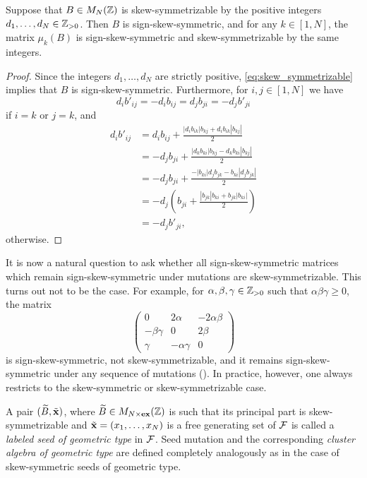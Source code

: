 \begin{proposition}\label{prop:mutation_preserves_skew_symmetrizable}
	Suppose that $B \in M_N(\mathbb{Z})$ is skew-symmetrizable by the positive integers $d_1, \dots, d_N \in \mathbb{Z}_{>0}$. Then $B$ is sign-skew-symmetric, and for any $k \in [1, N]$, the matrix $\mu_k(B)$ is sign-skew-symmetric and skew-symmetrizable by the same integers.
\end{proposition}
\begin{proof}
	Since the integers $d_1, \dots, d_N$ are strictly positive, \cref{eq:skew_symmetrizable} implies that $B$ is sign-skew-symmetric. Furthermore, for $i,j \in [1, N]$ we have
	\begin{equation*}
		d_i b'_{ij} = - d_i  b_{ij} = d_j b_{ji} = -d_j b'_{ji}
	\end{equation*}
	if $i =k$ or $j = k$, and
	\begin{align*}
		d_i b'_{ij}
		 & = d_i b_{ij} + \frac{|d_i b_{ik}|b_{kj} + d_i b_{ik}|b_{kj}|}{2}         \\
		 & = - d_j b_{ji} + \frac{|d_k b_{ki}|b_{kj} - d_k b_{ki}|b_{kj}|}{2}       \\
		 & = - d_j b_{ji} + \frac{ - |b_{ki}| d_j b_{jk} - b_{ki}|d_jb_{jk}|}{2}    \\
		 & = - d_j\left( b_{ji} + \frac{|b_{jk}|b_{ki} +  b_{jk}|b_{ki}|}{2}\right) \\
		 & = - d_jb'_{ji},
	\end{align*}
	otherwise.
\end{proof}

It is now a natural question to ask whether all sign-skew-symmetric matrices which
remain sign-skew-symmetric under mutations are skew-symmetrizable. This turns out not
to be the case. For example, for $\alpha, \beta, \gamma \in \mathbb{Z}_{>0}$ such that
$\alpha\beta\gamma \geq 0$, the matrix
\begin{equation*}
	\begin{pmatrix}
		0             & 2\alpha         & -2\alpha \beta \\
		-\beta \gamma & 0               & 2 \beta        \\
		\gamma        & - \alpha \gamma & 0
	\end{pmatrix}
\end{equation*}
%
is sign-skew-symmetric, not skew-symmetrizable, and it remains sign-skew-symmetric
under any sequence of mutations (\cite[Proposition 4.7]{FominZelevinsky2002CAF}). In
practice, however, one always restricts to the skew-symmetric or skew-symmetrizable
case.
\begin{definition}\label{def:cluster_algebra_geometric_type}

	A pair $(\widetilde{B}, \tilde{\mathbf{x}})$, where $\widetilde{B} \in M_{N \times \mathbf{ex}}(\mathbb{Z})$ is such that its principal
	part is skew-symmetrizable and $\tilde{\mathbf{x}} = (x_1, \dots, x_N)$ is a free generating set of
	$\mathcal{F}$ is called a \emph{labeled seed of geometric type}
	in $\mathcal{F}$. Seed mutation and the corresponding \emph{cluster algebra of geometric
		type} are defined completely analogously as in
	the case of skew-symmetric seeds of geometric type.
\end{definition}

